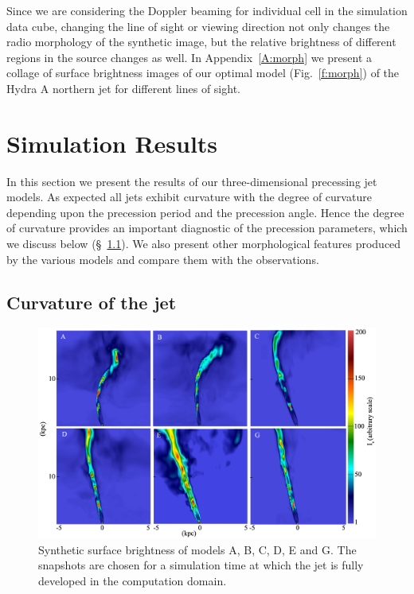 \documentclass[useAMS, usenatbib]{mn2e}
\begin{document}
Since we are considering the Doppler beaming for individual cell in the simulation data cube, changing the line of sight or viewing direction not only changes the radio morphology of the synthetic image, but the relative brightness of different regions in the source changes as well. In Appendix~\ref{A:morph} we present a collage of surface brightness images of our optimal model (Fig.~\ref{f:morph}) of the Hydra A northern jet for different lines of sight.



%
%

\section{Simulation Results}\label{s:results}

In this section we present the results of our three-dimensional precessing jet models. As expected all jets exhibit curvature with the degree of curvature depending upon the precession period and the precession angle. Hence the degree of curvature provides an important diagnostic of the precession parameters, which we discuss below (\S~\ref{curvature}).  We also present other morphological features produced by the various models and compare them with the observations.   
  
\subsection{Curvature of the jet}
\label{curvature}
\begin{figure}
\centering
\includegraphics[width=\textwidth]{fig4.eps}
\caption{Synthetic surface brightness of models A, B, C, D, E and G. The snapshots are chosen for a simulation time at which the jet is fully developed in the computation domain. }
\label{f:cur}
\end{figure}
\end{document}
